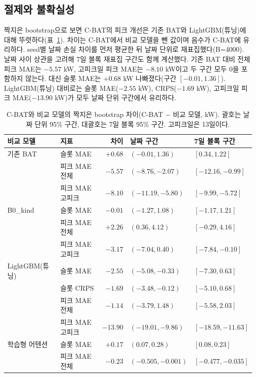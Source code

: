 \subsection{절제와 불확실성}

짝지은 bootstrap으로 보면 C-BAT의 피크 개선은 기존 BAT와 LightGBM(튜닝)에 대해 뚜렷하다(표~\ref{tab:ch4-boot}). 차이는 C-BAT에서 비교 모델을 뺀 값이며 음수가 C-BAT에 유리하다. seed별 날짜 손실 차이를 먼저 평균한 뒤 날짜 단위로 재표집했다(B=4000). 날짜 사이 상관을 고려해 7일 블록 재표집 구간도 함께 계산했다. 기존 BAT 대비 전체 피크 MAE는 $-5.57$ kW, 고피크일 피크 MAE는 $-8.10$ kW이고 두 구간 모두 0을 포함하지 않는다. 대신 슬롯 MAE는 $+0.68$ kW 나빠졌다(구간 $[-0.01, 1.36]$). LightGBM(튜닝) 대비로는 슬롯 MAE($-2.55$ kW), CRPS($-1.69$ kW), 고피크일 피크 MAE($-13.90$ kW)가 모두 날짜 단위 구간에서 유리하다.

\begin{table}[htbp]
\centering
\caption{C-BAT와 비교 모델의 짝지은 bootstrap 차이(C-BAT $-$ 비교 모델, kW). 괄호는 날짜 단위 95\% 구간, 대괄호는 7일 블록 95\% 구간. 고피크일은 13일이다.}
\label{tab:ch4-boot}
\small
\begin{tabular}{llrll}
\toprule
비교 모델 & 지표 & 차이 & 날짜 구간 & 7일 블록 구간 \\
\midrule
기존 BAT & 슬롯 MAE & $+0.68$ & $(-0.01, 1.36)$ & $[0.34, 1.22]$ \\
 & 피크 MAE 전체 & $-5.57$ & $(-8.76, -2.07)$ & $[-12.16, -0.99]$ \\
 & 피크 MAE 고피크 & $-8.10$ & $(-11.19, -5.80)$ & $[-9.99, -5.72]$ \\
\midrule
B0\_kind & 슬롯 MAE & $-0.01$ & $(-1.27, 1.08)$ & $[-1.17, 1.21]$ \\
 & 피크 MAE 전체 & $+2.26$ & $(0.36, 4.12)$ & $[-0.29, 4.16]$ \\
 & 피크 MAE 고피크 & $-3.17$ & $(-7.04, 0.40)$ & $[-7.84, -0.10]$ \\
\midrule
LightGBM(튜닝) & 슬롯 MAE & $-2.55$ & $(-5.08, -0.33)$ & $[-7.30, 0.63]$ \\
 & 슬롯 CRPS & $-1.69$ & $(-3.48, -0.12)$ & $[-5.10, 0.68]$ \\
 & 피크 MAE 전체 & $-1.14$ & $(-3.79, 1.48)$ & $[-5.58, 2.03]$ \\
 & 피크 MAE 고피크 & $-13.90$ & $(-19.01, -9.86)$ & $[-18.59, -11.63]$ \\
\midrule
학습형 어텐션 & 슬롯 MAE & $+0.17$ & $(0.07, 0.28)$ & $[0.08, 0.23]$ \\
 & 피크 MAE 전체 & $-0.23$ & $(-0.505, -0.001)$ & $[-0.477, -0.035]$ \\
\bottomrule
\end{tabular}
\end{table}

